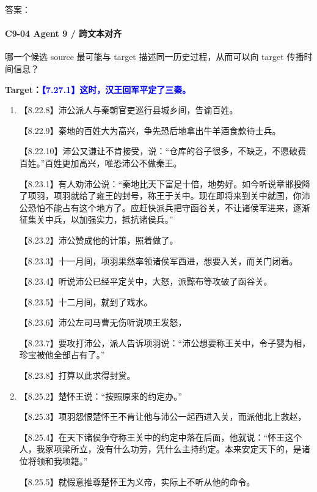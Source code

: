 \documentclass[fontset=none,11pt,a4paper]{ctexart}
\newcommand{\answerline}[1]{\underline{\hspace{#1}}}
\begin{document}
答案：\answerline{2.2cm}

\paragraph{C9-04 \quad Agent 9 / 跨文本对齐}
哪一个候选 source 最可能与 target 描述同一历史过程，从而可以向 target 传播时间信息？

\textbf{Target：}\textcolor{blue}{\textbf{【7.27.1】这时，汉王回军平定了三秦。}}

\begin{enumerate}[label=\Alph*.]
  \item
\noindent 【8.22.8】沛公派人与秦朝官吏巡行县城乡间，告谕百姓。\par
\noindent 【8.22.9】秦地的百姓大为高兴，争先恐后地拿出牛羊酒食款待士兵。\par
\noindent 【8.22.10】沛公又谦让不肯接受，说：“仓库的谷子很多，不缺乏，不愿破费百姓。”百姓更加高兴，唯恐沛公不做秦王。\par
\noindent 【8.23.1】有人劝沛公说：“秦地比天下富足十倍，地势好。如今听说章邯投降了项羽，项羽就给了雍王的封号，称王于关中。现在即将来到关中就国，你沛公恐怕不能占有这个地方了。应赶快派兵把守函谷关，不让诸侯军进来，逐渐征集关中兵，以加强实力，抵抗诸侯兵。”\par
\noindent 【8.23.2】沛公赞成他的计策，照着做了。\par
\noindent 【8.23.3】十一月间，项羽果然率领诸侯军西进，想要入关，而关门闭着。\par
\noindent 【8.23.4】听说沛公已经平定关中，大怒，派黥布等攻破了函谷关。\par
\noindent 【8.23.5】十二月间，就到了戏水。\par
\noindent 【8.23.6】沛公左司马曹无伤听说项王发怒，\par
\noindent 【8.23.7】要攻打沛公，派人告诉项羽说：“沛公想要称王关中，令子婴为相，珍宝被他全部占有了。”\par
\noindent 【8.23.8】打算以此求得封赏。\par
  \item
\noindent 【8.25.2】楚怀王说：“按照原来的约定办。”\par
\noindent 【8.25.3】项羽怨恨楚怀王不肯让他与沛公一起西进入关，而派他北上救赵，\par
\noindent 【8.25.4】在天下诸侯争夺称王关中的约定中落在后面，他就说：“怀王这个人，我家项梁所立，没有什么功劳，凭什么主持约定。本来安定天下的，是诸位将领和我项籍。”\par
\noindent 【8.25.5】就假意推尊楚怀王为义帝，实际上不听从他的命令。\par

\end{enumerate}
\end{document}

